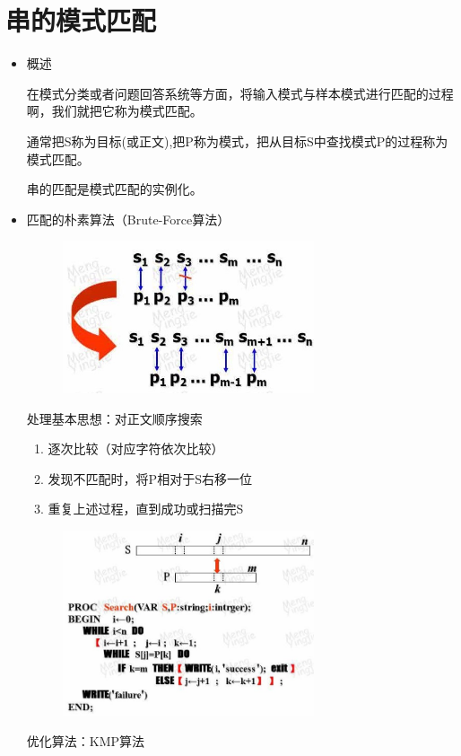 \documentclass[AutoFakeBold]{LZUThesis2007}
\begin{document}
	\section{串的模式匹配}
		\begin{itemize}
			\item 概述

	在模式分类或者问题回答系统等方面，将输入模式与样本模式进行匹配的过程啊，我们就把它称为模式匹配。
	
	通常把S称为目标(或正文),把P称为模式，把从目标S中查找模式P的过程称为模式匹配。
	
	串的匹配是模式匹配的实例化。

			\item 匹配的朴素算法（Brute-Force算法）
			\begin{figure}[H]
			    \centering
			    \includegraphics[width=0.7\textwidth]{figures/5.1.jpg}
			    
			    \label{fig_install_texlive}
			\end{figure}

			处理基本思想：对正文顺序搜索
				\begin{enumerate}
					\item 逐次比较（对应字符依次比较）
					\item 发现不匹配时，将P相对于S右移一位
					\item 重复上述过程，直到成功或扫描完S
				\end{enumerate}
			\begin{figure}[H]
			    \centering
			    \includegraphics[width=0.7\textwidth]{figures/5.2.jpg}
			    
			    \label{fig_install_texlive}
			\end{figure}

			优化算法：KMP算法
		\end{itemize}
\end{document}
